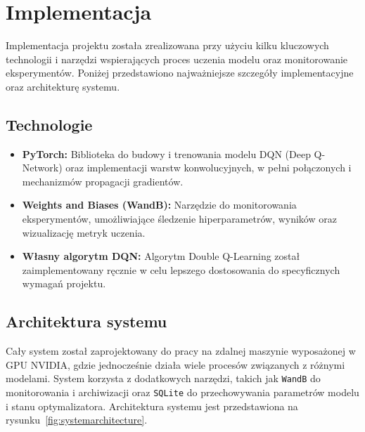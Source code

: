\chapter{Implementacja}

Implementacja projektu została zrealizowana przy użyciu kilku kluczowych technologii i narzędzi wspierających proces uczenia modelu oraz monitorowanie eksperymentów. Poniżej przedstawiono najważniejsze szczegóły implementacyjne oraz architekturę systemu.

\section{Technologie}

\begin{itemize}
	\item \textbf{PyTorch:} Biblioteka do budowy i trenowania modelu DQN (Deep Q-Network) oraz implementacji warstw konwolucyjnych, w pełni połączonych i mechanizmów propagacji gradientów.
	\item \textbf{Weights and Biases (WandB):} Narzędzie do monitorowania eksperymentów, umożliwiające śledzenie hiperparametrów, wyników oraz wizualizację metryk uczenia.
	\item \textbf{Własny algorytm DQN:} Algorytm Double Q-Learning został zaimplementowany ręcznie w celu lepszego dostosowania do specyficznych wymagań projektu.
\end{itemize}
\section{Architektura systemu}

Cały system został zaprojektowany do pracy na zdalnej maszynie wyposażonej w GPU NVIDIA, gdzie jednocześnie działa wiele procesów związanych z różnymi modelami. System korzysta z dodatkowych narzędzi, takich jak \texttt{WandB} do monitorowania i archiwizacji oraz \texttt{SQLite} do przechowywania parametrów modelu i stanu optymalizatora. Architektura systemu jest przedstawiona na rysunku~\ref{fig:systemarchitecture}.

